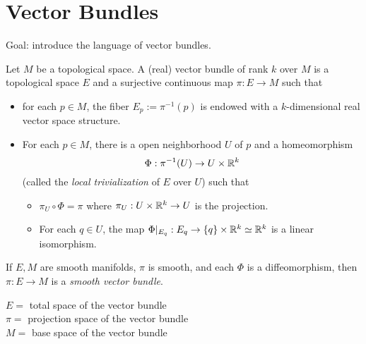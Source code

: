 \section{Vector Bundles}
Goal: introduce the language of vector bundles. 
\begin{definition}
    Let $M$ be a topological space. A (real) vector bundle of rank $k$ over $M$ is a topological space $E$ and a surjective continuous map $\pi:E \to M$ such that
    \begin{itemize}
    \item for each $p \in M$, the fiber $E_p:=\pi^{-1}(p)$ is endowed with a $k$-dimensional real vector space structure.
    \item For each $p \in M$, there is a open neighborhood $U$ of $p$ and a homeomorphism
    $$ \Phi:\pi^{-1}(U) \to U \times \mathbb{R}^k $$
    (called the \textit{local trivialization} of $E$ over $U$) such that 
    \begin{itemize}
        \item $\pi_U \circ \Phi = \pi$ where $\pi_U:U \times \mathbb{R}^k \to U$ is the projection. 
        \item For each $q \in U$, the map $\Phi|_{E_q}: E_q \to \{q\} \times \mathbb{R}^k \simeq \mathbb{R}^k $ is a linear isomorphism.
    \end{itemize}
    \end{itemize}
    If $E,M$ are smooth manifolds, $\pi$ is smooth, and each $\Phi$ is a diffeomorphism, then $\pi:E \to M$ is a \textit{smooth vector bundle}.
\end{definition}

$E = $ total space of the vector bundle \\
$\pi =$ projection space of the vector bundle \\
$M = $ base space of the vector bundle 

